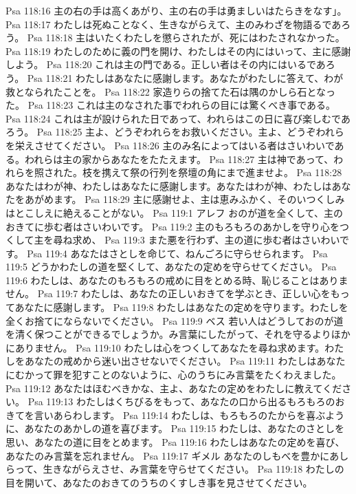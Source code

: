 Psa 118:16  主の右の手は高くあがり、主の右の手は勇ましいはたらきをなす」。
Psa 118:17  わたしは死ぬことなく、生きながらえて、主のみわざを物語るであろう。
Psa 118:18  主はいたくわたしを懲らされたが、死にはわたされなかった。
Psa 118:19  わたしのために義の門を開け、わたしはその内にはいって、主に感謝しよう。
Psa 118:20  これは主の門である。正しい者はその内にはいるであろう。
Psa 118:21  わたしはあなたに感謝します。あなたがわたしに答えて、わが救となられたことを。
Psa 118:22  家造りらの捨てた石は隅のかしら石となった。
Psa 118:23  これは主のなされた事でわれらの目には驚くべき事である。
Psa 118:24  これは主が設けられた日であって、われらはこの日に喜び楽しむであろう。
Psa 118:25  主よ、どうぞわれらをお救いください。主よ、どうぞわれらを栄えさせてください。
Psa 118:26  主のみ名によってはいる者はさいわいである。われらは主の家からあなたをたたえます。
Psa 118:27  主は神であって、われらを照された。枝を携えて祭の行列を祭壇の角にまで進ませよ。
Psa 118:28  あなたはわが神、わたしはあなたに感謝します。あなたはわが神、わたしはあなたをあがめます。
Psa 118:29  主に感謝せよ、主は恵みふかく、そのいつくしみはとこしえに絶えることがない。
Psa 119:1  アレフ おのが道を全くして、主のおきてに歩む者はさいわいです。
Psa 119:2  主のもろもろのあかしを守り心をつくして主を尋ね求め、
Psa 119:3  また悪を行わず、主の道に歩む者はさいわいです。
Psa 119:4  あなたはさとしを命じて、ねんごろに守らせられます。
Psa 119:5  どうかわたしの道を堅くして、あなたの定めを守らせてください。
Psa 119:6  わたしは、あなたのもろもろの戒めに目をとめる時、恥じることはありません。
Psa 119:7  わたしは、あなたの正しいおきてを学ぶとき、正しい心をもってあなたに感謝します。
Psa 119:8  わたしはあなたの定めを守ります。わたしを全くお捨てにならないでください。
Psa 119:9  ベス 若い人はどうしておのが道を清く保つことができるでしょうか。み言葉にしたがって、それを守るよりほかにありません。
Psa 119:10  わたしは心をつくしてあなたを尋ね求めます。わたしをあなたの戒めから迷い出させないでください。
Psa 119:11  わたしはあなたにむかって罪を犯すことのないように、心のうちにみ言葉をたくわえました。
Psa 119:12  あなたはほむべきかな、主よ、あなたの定めをわたしに教えてください。
Psa 119:13  わたしはくちびるをもって、あなたの口から出るもろもろのおきてを言いあらわします。
Psa 119:14  わたしは、もろもろのたからを喜ぶように、あなたのあかしの道を喜びます。
Psa 119:15  わたしは、あなたのさとしを思い、あなたの道に目をとめます。
Psa 119:16  わたしはあなたの定めを喜び、あなたのみ言葉を忘れません。
Psa 119:17  ギメル あなたのしもべを豊かにあしらって、生きながらえさせ、み言葉を守らせてください。
Psa 119:18  わたしの目を開いて、あなたのおきてのうちのくすしき事を見させてください。
